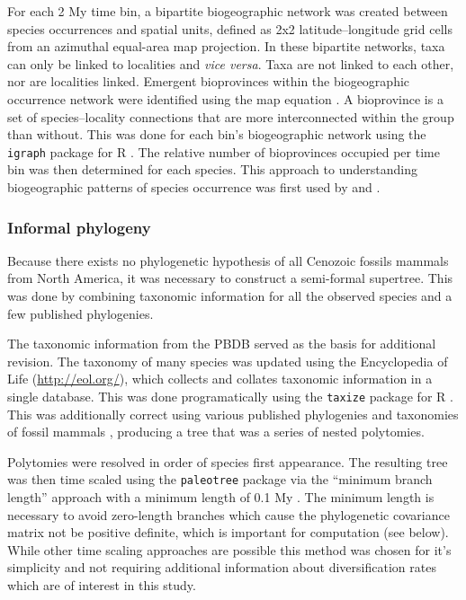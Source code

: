 \documentclass[12pt,letterpaper]{article}
\begin{document}
For each 2 My time bin, a bipartite biogeographic network was created between species occurrences and spatial units, defined as 2x2 latitude--longitude grid cells from an azimuthal equal-area map projection. In these bipartite networks, taxa can only be linked to localities and \textit{vice versa}. Taxa are not linked to each other, nor are localities linked. Emergent bioprovinces within the biogeographic occurrence network were identified using the map equation \citep{Rosvall2008,Rosvall2009a}. A bioprovince is a set of species--locality connections that are more interconnected within the group than without. This was done for each bin's biogeographic network using the \texttt{igraph} package for R \citep{csardi2006igraph,2014language}. The relative number of bioprovinces occupied per time bin was then determined for each species. This approach to understanding biogeographic patterns of species occurrence was first used by \citet{Sidor2013} and \citet{Vilhena2013}. 


\subsubsection{Informal phylogeny}

Because there exists no phylogenetic hypothesis of all Cenozoic fossils mammals from North America, it was necessary to construct a semi-formal supertree. This was done by combining taxonomic information for all the observed species and a few published phylogenies.

The taxonomic information from the PBDB served as the basis for additional revision. The taxonomy of many species was updated using the Encyclopedia of Life (\url{http://eol.org/}), which collects and collates taxonomic information in a single database. This was done programatically using the \texttt{taxize} package for R \citep{2013taxize}. This was additionally correct using various published phylogenies and taxonomies of fossil mammals \citep{Raia2012f,Janis1998,Janis2008}, producing a tree that was a series of nested polytomies. 

Polytomies were resolved in order of species first appearance. The resulting tree was then time scaled using the \texttt{paleotree} package via the ``minimum branch length'' approach with a minimum length of 0.1 My \citep{Bapst2012a}. The minimum length is necessary to avoid zero-length branches which cause the phylogenetic covariance matrix not be positive definite, which is important for computation (see below). While other time scaling approaches are possible \citep{Bapst2013a,Hedman2010} this method was chosen for it's simplicity and not requiring additional information about diversification rates which are of interest in this study. 
\end{document}
